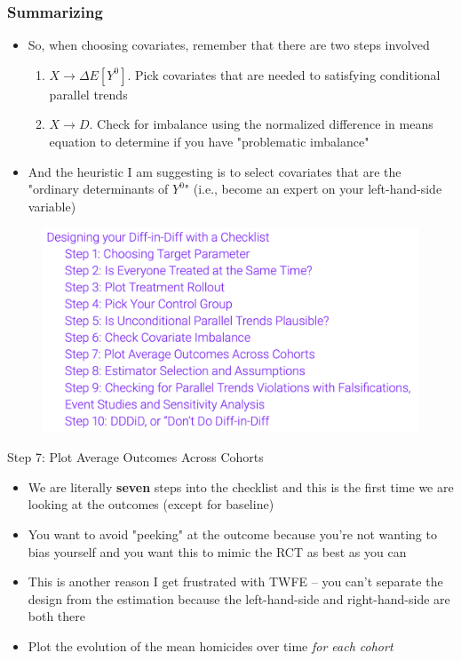 \documentclass{beamer}
\begin{document}
\begin{frame}
    \frametitle{Summarizing}
    \begin{itemize}
    \item So, when choosing covariates, remember that there are two steps involved
    	\begin{enumerate}
	\item $X \rightarrow \Delta E[Y^0]$. Pick covariates that are needed to satisfying conditional parallel trends 
	\item $X \rightarrow D$. Check for imbalance using the normalized difference in means equation to determine if you have "problematic imbalance"
	\end{enumerate}
\item And the heuristic I am suggesting is to select covariates that are the "ordinary determinants of $Y^0$" (i.e., become an expert on your left-hand-side variable)
    \end{itemize}
\end{frame}

\begin{frame}
 
\begin{figure}
    \centering
    \includegraphics[width=\textwidth]{./lecture_includes/checklist}
\end{figure}

\end{frame}





\begin{frame}{Step 7: Plot Average Outcomes Across Cohorts}

\begin{itemize}
\item We are literally \textbf{seven} steps into the checklist and this is the first time we are looking at the outcomes (except for baseline)
\item You want to avoid "peeking" at the outcome because you're not wanting to bias yourself and you want this to mimic the RCT as best as you can
\item This is another reason I get frustrated with TWFE -- you can't separate the design from the estimation because the left-hand-side and right-hand-side are both there 
\item Plot the evolution of the mean homicides over time \emph{for each cohort}
\end{itemize}

\end{frame}
\end{document}
